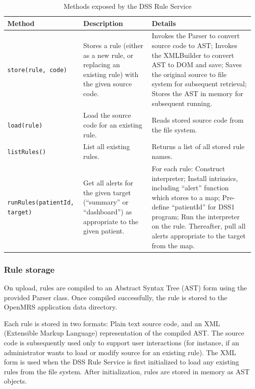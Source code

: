 \documentclass[12pt,letterpaper]{article}
\begin{document}
{\begin{table}
\begin{center}
\begin{tabular}{ l | p{1in} | p{2in} }
Method & Description & Details \\ \hline

\texttt{store(rule, code)}
&
Stores a rule (either as a new rule, or replacing an existing rule) with the given source code.
&
Invokes the Parser to convert source code to AST; 
Invokes the XMLBuilder to convert AST to DOM and save; 
Saves the original source to file system for subsequent retrieval; 
Stores the AST in memory for subsequent running.
\\ \hline

\texttt{load(rule)}
&
Load the source code for an existing rule.
&
Reads stored source code from the file system.
\\ \hline

\texttt{listRules()}
&
List all existing rules.
&
Returns a list of all stored rule names.
\\ \hline

\texttt{runRules(patientId, target)}
&
Get all alerts for the given target (“summary” or “dashboard”) as appropriate to the given patient.
&
For each rule:
Construct interpreter; 
Install intrinsics, including “alert” function which stores to a map;
Pre-define “patientId” for DSS1 program;
Run the interpreter on the rule.
Thereafter, pull all alerts appropriate to the target from the map.
\\ \hline

\end{tabular}
\end{center}
\caption{Methods exposed by the DSS Rule Service}
\label{tab:RULE_SERVICE}
\end{table}

\subsubsection{Rule storage} \label{sec:RULE_STORAGE}

On upload, rules are compiled to an Abstract Syntax Tree (AST) form 
using the provided Parser class. Once compiled successfully, the rule is stored to the OpenMRS application data directory. 

Each rule is  stored in two formats: Plain text source code, and an XML (Extensible Markup Language) representation of the compiled AST. The 
source code is subsequently used only to support user interactions (for instance, if an administrator wants to load or modify source for an existing rule). The XML form is used when the DSS Rule Service is first initialized to load any existing rules from the file system. After initialization, rules are stored in memory as AST objects.

}
\end{document}
